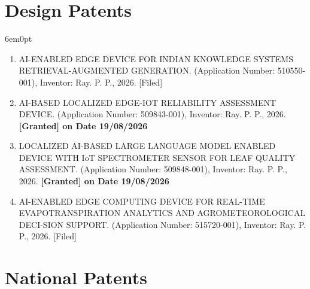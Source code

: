 \documentclass[11pt,a4paper]{moderncv}
\begin{document}
\section{\textbf{Design Patents}}

\begin{adjustwidth}{6em}{0pt}
	\begin{enumerate}
		
		\item AI-ENABLED EDGE DEVICE FOR INDIAN KNOWLEDGE SYSTEMS RETRIEVAL-AUGMENTED GENERATION. (Application Number: 510550-001), Inventor: Ray. P. P., 2026. [Filed]
		
		\item AI-BASED LOCALIZED EDGE-IOT RELIABILITY ASSESSMENT DEVICE. (Application Number: 509843-001), Inventor: Ray. P. P., 2026. \textbf{[Granted] on Date 19/08/2026}
		
		\item LOCALIZED AI-BASED LARGE LANGUAGE MODEL ENABLED DEVICE WITH IoT SPECTROMETER SENSOR FOR LEAF QUALITY ASSESSMENT. (Application Number: 509848-001), Inventor: Ray. P. P., 2026. \textbf{[Granted] on Date 19/08/2026}
		
		\item AI-ENABLED EDGE COMPUTING DEVICE FOR REAL-TIME EVAPOTRANSPIRATION ANALYTICS AND AGROMETEOROLOGICAL DECI-SION SUPPORT. (Application Number: 515720-001), Inventor: Ray. P. P., 2026.  [Filed]	
		
		
		
		
	\end{enumerate}
\end{adjustwidth}





\section{\textbf{National Patents}}
\end{document}
